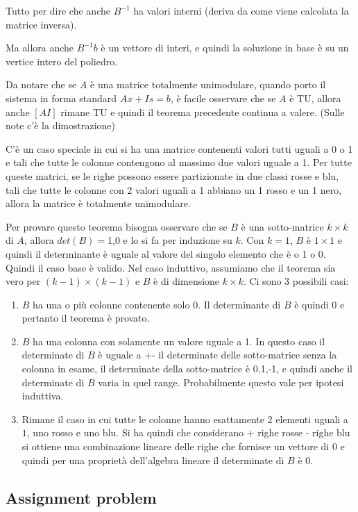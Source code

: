 Tutto per dire che anche $B^{-1}$ ha valori interni (deriva da come viene calcolata la matrice inversa).

Ma allora anche $B^{-1}b$ è un vettore di interi, e quindi la soluzione in base è su un vertice intero del poliedro.


Da notare che se $A$ è una matrice totalmente unimodulare, quando porto il sistema in forma standard $Ax + Is = b$, è facile osservare che se $A$ è TU, allora anche $[A I]$ rimane TU e quindi il teorema precedente continua a valere. (Sulle note c'è la dimostrazione)  


C'è un caso speciale in cui si ha una matrice contenenti valori tutti uguali a 0 o 1 e tali che tutte le colonne contengono al massimo due valori uguale a 1. Per tutte queste matrici, se le righe possono essere partizionate in due classi rosse e blu, tali che tutte le colonne con 2 valori uguali a 1 abbiano un 1 rosso e un 1 nero, allora la matrice è totalmente unimodulare.

Per provare questo teorema bisogna osservare che se $B$ è una sotto-matrice $k \times k$ di $A$, allora $det(B) = $1,0 e lo si fa per induzione su $k$.
Con $k = 1$, $B$ è $1 \times 1$ e quindi il determinante è uguale al valore del singolo elemento che è o 1 o 0. Quindi il caso base è valido.
Nel caso induttivo, assumiamo che il teorema sia vero per $(k-1) \times (k-1)$ e $B$ è di dimensione $k \times k$. Ci sono 3 possibili casi:

\begin{enumerate}
	\item $B$ ha una o più colonne contenente solo 0. Il determinante di $B$ è quindi 0 e pertanto il teorema è provato.
	\item $B$ ha una colonna con solamente un valore uguale a 1. In questo caso il determinate di $B$ è uguale a +- il determinate delle sotto-matrice senza la colonna in esame, il determinate della sotto-matrice è 0,1,-1, e quindi anche il determinate di $B$ varia in quel range. Probabilmente questo vale per ipotesi induttiva.
	\item Rimane il caso in cui tutte le colonne hanno esattamente 2 elementi uguali a $1$, uno rosso e uno blu. Si ha quindi che considerano + righe rosse - righe blu si ottiene una combinazione lineare delle righe che fornisce un vettore di 0 e quindi per una proprietà dell'algebra lineare il determinate di $B$ è 0.
\end{enumerate}

\subsection{Assignment problem}

